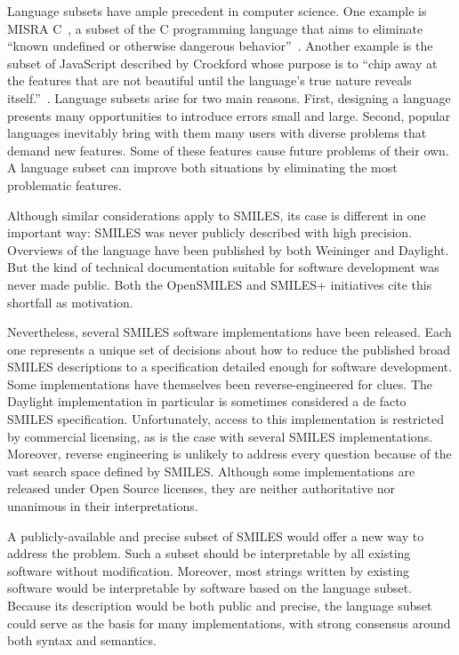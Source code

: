 \documentclass{article}
\begin{document}
Language subsets have ample precedent in computer science. One example is MISRA C~\cite{misraC}, a subset of the C programming language that aims to eliminate \enquote{known undefined or otherwise dangerous behavior}~\cite{hatton:2007}. Another example is the subset of JavaScript described by Crockford whose purpose is to \enquote{chip away at the features that are not beautiful until the language's true nature reveals itself.}~\cite{crockford:2008}. Language subsets arise for two main reasons. First, designing a language presents many opportunities to introduce errors small and large. Second, popular languages inevitably bring with them many users with diverse problems that demand new features. Some of these features cause future problems of their own. A language subset can improve both situations by eliminating the most problematic features.

Although similar considerations apply to SMILES, its case is different in one important way: SMILES was never publicly described with high precision. Overviews of the language have been published by both Weininger and Daylight. But the kind of technical documentation suitable for software development was never made public. Both the OpenSMILES and SMILES+ initiatives cite this shortfall as motivation.

Nevertheless, several SMILES software implementations have been released. Each one represents a unique set of decisions about how to reduce the published broad SMILES descriptions to a specification detailed enough for software development. Some implementations have themselves been reverse-engineered for clues. The Daylight implementation in particular is sometimes considered a de facto SMILES specification. Unfortunately, access to this implementation is restricted by commercial licensing, as is the case with several SMILES implementations. Moreover, reverse engineering is unlikely to address every question because of the vast search space defined by SMILES. Although some implementations are released under Open Source licenses, they are neither authoritative nor unanimous in their interpretations.

A publicly-available and precise subset of SMILES would offer a new way to address the problem. Such a subset should be interpretable by all existing software without modification. Moreover, most strings written by existing software would be interpretable by software based on the language subset. Because its description would be both public and precise, the language subset could serve as the basis for many implementations, with strong consensus around both syntax and semantics.
\end{document}
